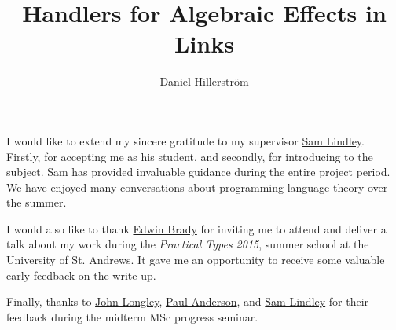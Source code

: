 \documentclass[msc,cs,twoside,openright,logo,rightchapter,normalheadings]{class/infthesis}
\title{Handlers for Algebraic Effects in Links}
\author{Daniel Hillerström}
\theoremstyle{definition}
\begin{document}
\raggedbottom
\begin{preliminary}

\maketitle

\begin{acknowledgements}
I would like to extend my sincere gratitude to my supervisor \href{http://homepages.inf.ed.ac.uk/slindley/}{Sam Lindley}. Firstly, for accepting me as his student, and secondly, for introducing to the subject. Sam has provided invaluable guidance during the entire project period. We have enjoyed many conversations about programming language theory over the summer.

I would also like to thank \href{https://www.cs.st-andrews.ac.uk/directory/person?id=eb}{Edwin Brady} for inviting me to attend and deliver a talk about my work during the \emph{Practical Types 2015}, summer school at the University of St. Andrews. It gave me an opportunity to receive some valuable early feedback on the write-up.

Finally, thanks to \href{http://homepages.inf.ed.ac.uk/jrl/}{John Longley}, \href{http://homepages.inf.ed.ac.uk/dcspaul/homepage/live/work/index.html}{Paul Anderson}, and \href{http://homepages.inf.ed.ac.uk/slindley/}{Sam Lindley} for their feedback during the midterm MSc progress seminar.
\end{acknowledgements}

\standarddeclaration


\setcounter{secnumdepth}{2} %
\setcounter{tocdepth}{1} %
\singlespace
\tableofcontents
\doublespace


\end{preliminary}




\singlespace
\printbibliography[heading=bibintoc]

\end{document}
